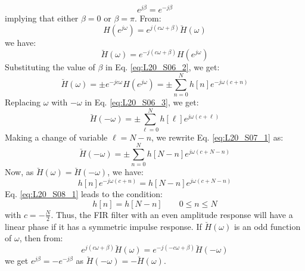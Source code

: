 \documentclass[../../main/main.tex]{subfiles}
\begin{document}
\begin{equation}
    e^{j\beta}
    =
    e^{-j\beta}
    \label{eq:L20_S05_3}
\end{equation}
implying that either \( \beta = 0 \) or \( \beta = \pi \). From:
\begin{equation}
    H(e^{j\omega})
    =
    e^{j(c\omega + \beta)} \breve{H}(\omega)
    \label{eq:L20_S06_1}
\end{equation}
we have:
\begin{equation}
    \breve{H}(\omega)
    =
    e^{-j(c\omega + \beta)} H(e^{j\omega})
    \label{eq:L20_S06_2}
\end{equation}
Substituting the value of \( \beta \) in Eq. \ref{eq:L20_S06_2}, we get:
\begin{equation}
    \breve{H}(\omega)
    =
    \pm e^{-jc\omega} H(e^{j\omega})
    =
    \pm \sum_{n=0}^{N} h[n] e^{-j\omega (c + n)}
    \label{eq:L20_S06_3}
\end{equation}
Replacing \( \omega \) with \( - \omega \) in Eq. \ref{eq:L20_S06_3}, we get:
\begin{equation}
    \breve{H}(-\omega)
    =
    \pm \sum_{\ell = 0}^{N} h[\ell] e^{j\omega (c + \ell)}
    \label{eq:L20_S07_1}
\end{equation}
Making a change of variable \( \ell = N - n \), we rewrite Eq. \ref{eq:L20_S07_1} as:
\begin{equation}
    \breve{H}(-\omega)
    =
    \pm \sum_{n=0}^{N} h[N-n] e^{j\omega (c + N - n)}
    \label{eq:L20_S07_2}
\end{equation}
Now, as \( \breve{H}(\omega) = \breve{H}(-\omega) \), we have:
\begin{equation}
    h[n] e^{-j\omega (c+n)}
    =
    h[N-n] e^{j\omega (c+N-n)}
    \label{eq:L20_S08_1}
\end{equation}
Eq. \ref{eq:L20_S08_1} leads to the condition:
\begin{equation}
    h[n]
    =
    h[N-n]
    \qquad
    0 \le n \le N
    \label{eq:L20_S08_2}
\end{equation}
with \( c = - \frac{N}{2} \). Thus, the FIR filter with an even amplitude response will have a linear phase if it has a symmetric impulse response. If \( \breve{H}(\omega) \) is an odd function of \( \omega \), then from:
\begin{equation}
    e^{j(c\omega + \beta)} \breve{H}(\omega)
    =
    e^{-j(-c\omega + \beta)} \breve{H}(-\omega)
    \label{eq:L20_S09_1}
\end{equation}
we get \( e^{j\beta} = - e^{-j\beta} \) as \( \breve{H}(-\omega) = - \breve{H}(\omega) \).
\end{document}
